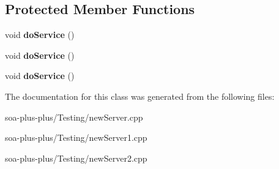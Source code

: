 \subsection*{Protected Member Functions}
\begin{DoxyCompactItemize}
\item 
\hypertarget{class_particular_registrable_poolable_cyclic_callable_skeleton_ac7c110bdb5d2e6600682811d5ef150f3}{
void {\bfseries doService} ()}
\label{class_particular_registrable_poolable_cyclic_callable_skeleton_ac7c110bdb5d2e6600682811d5ef150f3}

\item 
\hypertarget{class_particular_registrable_poolable_cyclic_callable_skeleton_ac7c110bdb5d2e6600682811d5ef150f3}{
void {\bfseries doService} ()}
\label{class_particular_registrable_poolable_cyclic_callable_skeleton_ac7c110bdb5d2e6600682811d5ef150f3}

\item 
\hypertarget{class_particular_registrable_poolable_cyclic_callable_skeleton_ac7c110bdb5d2e6600682811d5ef150f3}{
void {\bfseries doService} ()}
\label{class_particular_registrable_poolable_cyclic_callable_skeleton_ac7c110bdb5d2e6600682811d5ef150f3}

\end{DoxyCompactItemize}


The documentation for this class was generated from the following files:\begin{DoxyCompactItemize}
\item 
soa-\/plus-\/plus/Testing/newServer.cpp\item 
soa-\/plus-\/plus/Testing/newServer1.cpp\item 
soa-\/plus-\/plus/Testing/newServer2.cpp\end{DoxyCompactItemize}
